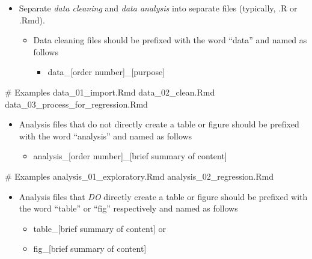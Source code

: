 \documentclass[
  letterpaper,
  DIV=11,
  numbers=noendperiod]{scrreprt}
\newenvironment{Shaded}{\begin{snugshade}}{\end{snugshade}}
\newcommand{\CommentTok}[1]{\textcolor[rgb]{0.37,0.37,0.37}{#1}}
\newcommand{\NormalTok}[1]{\textcolor[rgb]{0.00,0.23,0.31}{#1}}
\providecommand{\tightlist}{%
  \setlength{\itemsep}{0pt}\setlength{\parskip}{0pt}}\usepackage{longtable,booktabs,array}
\begin{document}
\begin{itemize}
\item
  Separate \emph{data cleaning} and \emph{data analysis} into separate
  files (typically, .R or .Rmd).

  \begin{itemize}
  \tightlist
  \item
    Data cleaning files should be prefixed with the word ``data'' and
    named as follows

    \begin{itemize}
    \tightlist
    \item
      data\_{[}order number{]}\_{[}purpose{]}
    \end{itemize}
  \end{itemize}
\end{itemize}

\begin{Shaded}
\begin{Highlighting}[]
\CommentTok{\# Examples}
\NormalTok{data\_01\_import.Rmd}
\NormalTok{data\_02\_clean.Rmd}
\NormalTok{data\_03\_process\_for\_regression.Rmd}
\end{Highlighting}
\end{Shaded}

\begin{itemize}
\tightlist
\item
  Analysis files that do not directly create a table or figure should be
  prefixed with the word ``analysis'' and named as follows

  \begin{itemize}
  \tightlist
  \item
    analysis\_{[}order number{]}\_{[}brief summary of content{]}
  \end{itemize}
\end{itemize}

\begin{Shaded}
\begin{Highlighting}[]
\CommentTok{\# Examples}
\NormalTok{analysis\_01\_exploratory.Rmd}
\NormalTok{analysis\_02\_regression.Rmd}
\end{Highlighting}
\end{Shaded}

\begin{itemize}
\tightlist
\item
  Analysis files that \emph{DO} directly create a table or figure should
  be prefixed with the word ``table'' or ``fig'' respectively and named
  as follows

  \begin{itemize}
  \tightlist
  \item
    table\_{[}brief summary of content{]} or\\
  \item
    fig\_{[}brief summary of content{]}
  \end{itemize}
\end{itemize}
\end{document}
